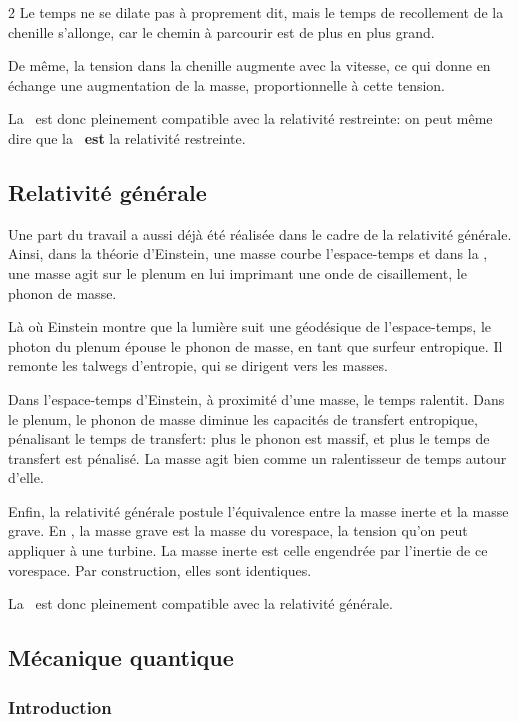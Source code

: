 \begin{multicols}{2}
Le temps ne se dilate pas à proprement dit, mais le temps de
recollement de la chenille s'allonge, car le chemin à parcourir est de
plus en plus grand.

De même, la tension dans la chenille augmente avec la vitesse, ce qui
donne en échange une augmentation de la masse, proportionnelle à cette
tension.

La \PQ\ est donc pleinement compatible avec la relativité restreinte:
on peut même dire que la \PQ\ \textbf{est} la relativité restreinte.

\subsection{Relativité générale}

Une part du travail a aussi déjà été réalisée dans le cadre de la
relativité générale. Ainsi, dans la théorie d'Einstein, une
masse courbe l'espace-temps et dans la \PQ, une masse agit sur le plenum
en lui imprimant une onde de cisaillement, le phonon de masse.

Là où Einstein montre que la lumière suit une géodésique de
l'espace-temps, le photon du plenum épouse le phonon de masse, en tant
que surfeur entropique. Il remonte les talwegs d'entropie, qui se
dirigent vers les masses.

Dans l'espace-temps d'Einstein, à proximité d'une masse, le temps
ralentit. Dans le plenum, le phonon de masse diminue les capacités de
transfert entropique, pénalisant le temps de transfert: plus le
phonon est massif, et plus le temps de transfert est pénalisé. La
masse agit bien comme un ralentisseur de temps autour d'elle.

Enfin, la relativité générale postule l'équivalence entre la masse
inerte et la masse grave. En \PQ, la masse grave est la masse du
vorespace, la tension qu'on peut appliquer à une turbine. La masse
inerte est celle engendrée par l'inertie de ce vorespace. Par
construction, elles sont identiques.

La \PQ\ est donc pleinement compatible avec la relativité générale.

\subsection{Mécanique quantique}

\subsubsection{Introduction}


\end{multicols}
